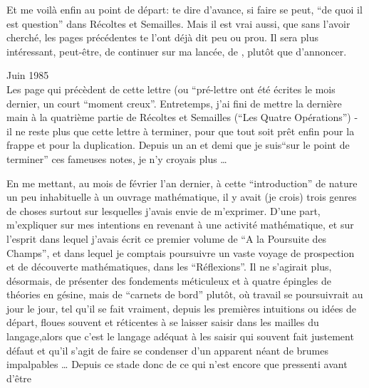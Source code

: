 Et me voilà  enfin  au point de départ: te dire d'avance, si faire se peut, ``de quoi il est question'' dans Récoltes et Semailles. Mais il est vrai aussi, que sans l'avoir cherché, les pages précédentes te l'ont déjà dit peu ou prou. Il sera plus intéressant, peut-être, de continuer  sur ma lancée,  de , plutôt que d'annoncer.

Juin 1985\\

 Les page qui précèdent de cette lettre (ou ``pré-lettre ont été écrites  le mois dernier,  un court ``moment creux''. Entretemps, j'ai fini de mettre la dernière main à la quatrième partie de Récoltes et Semailles (``Les Quatre Opérations'') - il ne reste plus que cette lettre à terminer, pour que tout soit prêt enfin pour la frappe et pour la duplication. Depuis  un an et demi que je suis``sur le point de terminer'' ces fameuses notes, je n'y croyais plus \ldots

En me mettant, au mois de février l'an dernier, à cette ``introduction'' de nature un peu inhabituelle à un ouvrage mathématique, il y avait (je crois) trois genres de choses surtout sur lesquelles j'avais envie de m'exprimer. D'une part,  m'expliquer sur mes intentions en revenant à une activité mathématique, et sur l'esprit dans lequel j'avais écrit ce premier volume de ``A la Poursuite des Champs'', et dans lequel je comptais poursuivre un vaste voyage de prospection et de découverte mathématiques, dans les ``Réflexions''.\deleted{(} Il ne s'agirait plus, désormais, de présenter des fondements méticuleux et à quatre épingles de théories en gésine, mais de ``carnets de bord'' plutôt, où  travail  se poursuivrait au jour le jour, tel qu'il se fait vraiment, depuis les premières intuitions ou idées de départ, floues souvent  et réticentes à se laisser saisir dans les mailles du langage,\deleted{(}alors que c'est le langage adéquat à les saisir qui souvent fait justement défaut et qu'il s'agit de faire se condenser d'un apparent néant de brumes  impalpables \ldots{} Depuis ce stade donc de ce qui n'est encore que pressenti avant d'être

